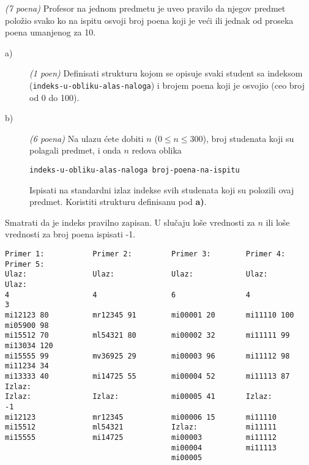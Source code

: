\begin{Exercise}[label=v1.3_01] 
{\em (7 poena)}
Profesor na jednom predmetu je uveo pravilo da njegov predmet
polo\v zio svako ko na ispitu osvoji broj poena koji je veći ili
jednak od proseka poena umanjenog za 10.

\begin{description}
\item[a)] {\em (1 poen)} Definisati strukturu kojom se opisuje svaki student sa indeksom ({\tt indeks-u-obliku-alas-naloga})
          i brojem poena koji je osvojio (ceo broj od 0 do 100).

\item[b)] {\em (6 poena)} Na ulazu ćete dobiti $n$ ($0 \le n \le 300$), broj studenata koji su polagali predmet,
i onda $n$ redova oblika
\begin{verbatim}
indeks-u-obliku-alas-naloga broj-poena-na-ispitu
\end{verbatim}
 Ispisati na standardni izlaz
indekse svih studenata koji su polozili ovaj predmet.  Koristiti strukturu definisanu pod {\bf a)}.

\end{description}

Smatrati da je indeks pravilno zapisan. U slu\v caju lo\v se vrednosti za $n$ ili lo\v se vrednosti za broj poena ispisati -1.
\begin{center}
\begin{verbatim}
Primer 1:           Primer 2:         Primer 3:        Primer 4:        Primer 5:
Ulaz:               Ulaz:             Ulaz:            Ulaz:            Ulaz:
4                   4                 6                4                3
mi12123 80          mr12345 91        mi00001 20       mi11110 100      mi05900 98
mi15512 70          ml54321 80        mi00002 32       mi11111 99       mi13034 120
mi15555 99          mv36925 29        mi00003 96       mi11112 98       mi11234 34
mi13333 40          mi14725 55        mi00004 52       mi11113 87       Izlaz:
Izlaz:              Izlaz:            mi00005 41       Izlaz:           -1
mi12123             mr12345           mi00006 15       mi11110
mi15512             ml54321           Izlaz:           mi11111
mi15555             mi14725           mi00003          mi11112
                                      mi00004          mi11113
                                      mi00005

\end{verbatim}
\end{center}
\end{Exercise}
\begin{Answer}[ref=v1.3_01]
\end{Answer}


